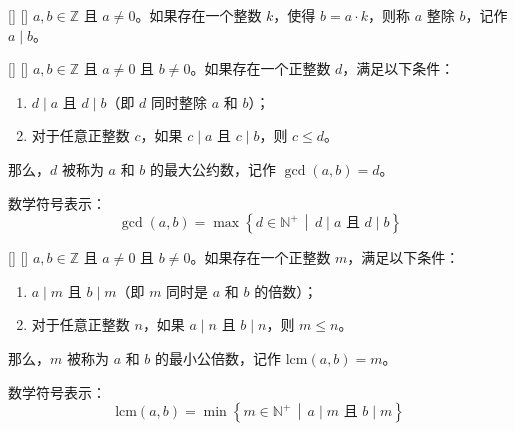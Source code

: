 \documentclass[UTF8]{ctexart}
\begin{document}
            \begin{dfn}
            []
            {}
            []
            []
                $a, b \in \mathbb{Z}$ 且 $a \neq 0$。如果存在一个整数 $k$，使得 $b = a \cdot k$，则称 $a$ 整除 $b$，记作 $a \mid b$。
           \end{dfn}

            \begin{dfn}
            []
            {}
            []
            []
                $a, b \in \mathbb{Z}$ 且 $a \neq 0$ 且 $b \neq 0$。如果存在一个正整数 $d$，满足以下条件：
                    \begin{enumerate}
                        \item $d \mid a$ 且 $d \mid b$（即 $d$ 同时整除 $a$ 和 $b$）；
                        \item  对于任意正整数 $c$，如果 $c \mid a$ 且 $c \mid b$，则 $c \leq d$。
                        
                    \end{enumerate}
                    那么，$d$ 被称为 $a$ 和 $b$ 的最大公约数，记作 $\gcd(a, b) = d$。

                    数学符号表示：
                        \[
                        \gcd(a, b) = \max\left\{ d \in \mathbb{N}^+ \,\middle|\, d \mid a \text{ 且 } d \mid b \right\}
                        \]
           \end{dfn}

            \begin{dfn}
            []
            {}
            []
            []
                $a, b \in \mathbb{Z}$ 且 $a \neq 0$ 且 $b \neq 0$。如果存在一个正整数 $m$，满足以下条件：
                
                    \begin{enumerate}
                        \item $a \mid m$ 且 $b \mid m$（即 $m$ 同时是 $a$ 和 $b$ 的倍数）；
                        \item 对于任意正整数 $n$，如果 $a \mid n$ 且 $b \mid n$，则 $m \leq n$。
                    \end{enumerate}
                
                那么，$m$ 被称为 $a$ 和 $b$ 的最小公倍数，记作 $\text{lcm}(a, b) = m$。
                
                数学符号表示：
                    \[
                    \text{lcm}(a, b) = \min\left\{ m \in \mathbb{N}^+ \,\middle|\, a \mid m \text{ 且  } b \mid m \right\}
                    \]
           \end{dfn}
\end{document}
